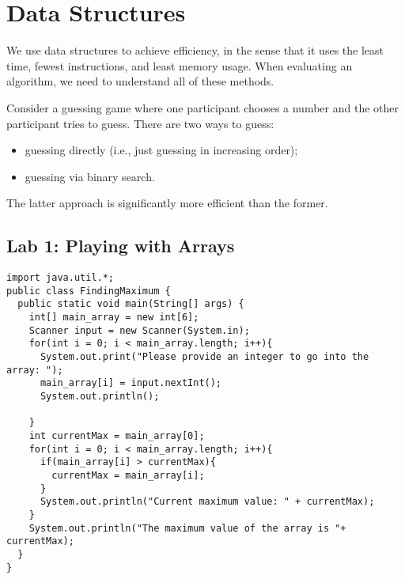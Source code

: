 \documentclass[10pt]{mypackage}
\begin{document}
\section{Data Structures}%
We use data structures to achieve efficiency, in the sense that it uses the least time, fewest instructions, and least memory usage. When evaluating an algorithm, we need to understand all of these methods.\newline

Consider a guessing game where one participant chooses a number and the other participant tries to guess. There are two ways to guess:
\begin{itemize}
  \item guessing directly (i.e., just guessing in increasing order);
  \item guessing via binary search.
\end{itemize}
The latter approach is significantly more efficient than the former.
\subsection{Lab 1: Playing with Arrays}%
  \begin{lstlisting}[style=javastyle,title=Finding Maximum Value in an Array]
import java.util.*;
public class FindingMaximum {
  public static void main(String[] args) {
    int[] main_array = new int[6];
    Scanner input = new Scanner(System.in);
    for(int i = 0; i < main_array.length; i++){
      System.out.print("Please provide an integer to go into the array: ");
      main_array[i] = input.nextInt();
      System.out.println();

    }
    int currentMax = main_array[0];
    for(int i = 0; i < main_array.length; i++){
      if(main_array[i] > currentMax){
        currentMax = main_array[i];
      }
      System.out.println("Current maximum value: " + currentMax);
    }
    System.out.println("The maximum value of the array is "+ currentMax);
  }
}
  \end{lstlisting}
  
\end{document}

